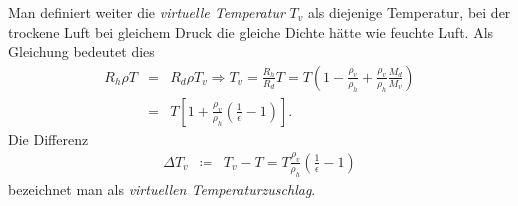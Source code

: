 \documentclass{book}
\begin{document}
%
Man definiert weiter die \textit{virtuelle Temperatur} $T_v$ als diejenige Temperatur, bei der trockene Luft bei gleichem Druck die gleiche Dichte hätte wie feuchte Luft. Als Gleichung bedeutet dies
%
\begin{eqnarray}
R_h\rho T & = & R_d\rho T_v\Rightarrow T_v = \frac{R_h}{R_d}T = T\left(1 - \frac{\rho_v}{\rho_h} + \frac{\rho_v}{\rho_h}\frac{M_d}{M_v}\right)\nonumber\\
& = & T\left[1 + \frac{\rho_v}{\rho_h}\left(\frac{1}{\epsilon} - 1\right)\right].
\end{eqnarray}
%
Die Differenz
%
\begin{eqnarray}
\Delta T_v& \coloneqq&T_v - T = T\frac{\rho_v}{\rho_h}\left(\frac{1}{\epsilon} - 1\right)
\end{eqnarray}
%
bezeichnet man als \textit{virtuellen Temperaturzuschlag}.
\end{document}
